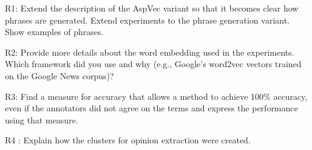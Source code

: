 R1: Extend the description of the AspVec variant so that it becomes clear how phrases are generated. Extend experiments to the phrase generation variant. Show examples of phrases.

R2: Provide more details about the word embedding used in the experiments. Which framework did you use and why (e.g., Google's word2vec vectors trained on the Google 
News corpus)? 

R3: Find a measure for accuracy that allows a method to achieve 100\% accuracy, even if the annotators did not agree on the terms and express the performance using that measure.

R4 : Explain how the clusters for opinion extraction were created.


